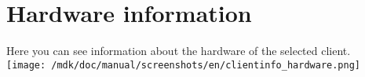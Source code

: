 \section{Hardware information}Here you can see information about the hardware of the selected client.\\
\texttt{[image: /mdk/doc/manual/screenshots/en/clientinfo\_hardware.png]} \\
